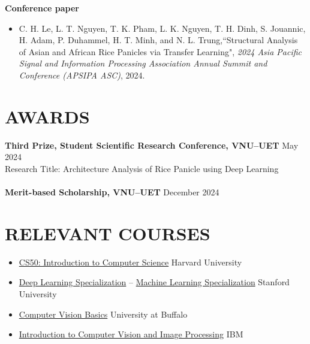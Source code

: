 \documentclass[a4paper,9pt]{extarticle}
\newcommand{\colormyname}[1]{\textcolor{myred}{#1}}
\begin{document}
\noindent
\textbf{Conference paper}
\begin{itemize}
    \item C. H. Le, \colormyname{L. T. Nguyen}, T. K. Pham, L. K. Nguyen, T. H. Dinh, S. Jouannic, H. Adam, P. Duhammel, H. T. Minh, and N. L. Trung,``Structural Analysis of Asian and African Rice Panicles via Transfer Learning", \textit{2024 Asia Pacific Signal and Information Processing Association Annual Summit and Conference (APSIPA ASC)}, 2024.
\end{itemize}

\section*{AWARDS}
\textbf{Third Prize, Student Scientific Research Conference, VNU--UET} \hfill May 2024\\ 
Research Title: Architecture Analysis of Rice Panicle using Deep Learning \\ \\
\textbf{Merit-based Scholarship, VNU--UET} \hfill  December 2024 

\section*{RELEVANT COURSES}
\begin{itemize}
    \item \href{https://certificates.cs50.io/3f3f35e9-bda6-4487-84a3-2d11b3706bba.pdf?size=letter}{CS50: Introduction to Computer Science} \hfill Harvard University
    \item \href{https://www.credly.com/badges/6dfef240-b0c0-423f-9c94-897d0940c790/public_url}{Deep Learning Specialization} -- \href{https://www.coursera.org/account/accomplishments/specialization/N234W2TA9VF3}{Machine Learning Specialization} \hfill Stanford University
    \item \href{https://www.coursera.org/account/accomplishments/certificate/L9TKVLPXS79W}{Computer Vision Basics} \hfill University at Buffalo
    \item \href{https://www.credly.com/go/GHFkiYLI}{Introduction to Computer Vision and Image Processing} \hfill IBM
\end{itemize}
\end{document}
